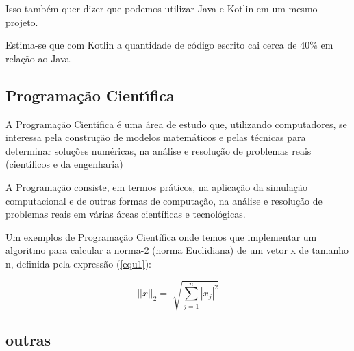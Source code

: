 Isso também quer dizer que podemos utilizar Java e Kotlin em um mesmo projeto.

Estima-se que com Kotlin a quantidade de código escrito
cai cerca de 40\% em relação ao Java. 

\subsection{ Programa\c{c}\~{a}o Cient\'{\i}fica}
A Programação Científica é uma área de estudo que,
utilizando computadores, se interessa pela
construção de modelos matemáticos e pelas técnicas 
para determinar soluções numéricas, na
análise e resolução de problemas reais
(científicos e da engenharia)

A Programação consiste, em termos práticos, na aplicação da 
simulação computacional e de outras formas de
computação, na análise e resolução de problemas 
reais em várias áreas científicas e tecnológicas.

Um exemplos de Programação Científica onde temos que implementar um 
algoritmo para calcular a norma-2 (norma Euclidiana) de um vetor x
de tamanho n, definida pela expressão (\ref*{equ1}):

\begin{center}
   \begin{equation}
      ||x||_{2} = \sqrt[]{\sum^{n}_{j=1} |x_{j}|^{2}}
      \label{equ1}
   \end{equation}
\end{center}


\subsection{ outras}